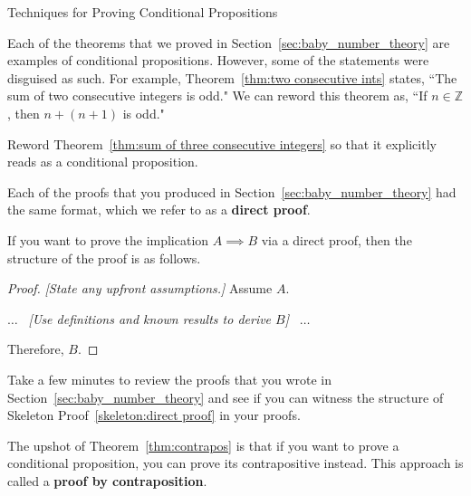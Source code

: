 \begin{section}{Techniques for Proving Conditional Propositions}\label{sec:Techniques_for_Proving_Conditional_Propositions}

Each of the theorems that we proved in Section~\ref{sec:baby_number_theory} are examples of conditional propositions. However, some of the statements were disguised as such. For example, Theorem~\ref{thm:two consecutive ints} states, ``The sum of two consecutive integers is odd." We can reword this theorem as, ``If $n\in\mathbb{Z}$, then $n+(n+1)$ is odd."

\begin{problem}\label{prob:reword as conditional}
Reword Theorem~\ref{thm:sum of three consecutive integers} so that it explicitly reads as a conditional proposition.
\end{problem}

Each of the proofs that you produced in Section~\ref{sec:baby_number_theory} had the same format, which we refer to as a \textbf{direct proof}. 

\begin{skeleton}\label{skeleton:direct proof}

If you want to prove the implication $A\implies B$ via a direct proof, then the structure of the proof is as follows.

\begin{mdframed}[style=skeleton]
\begin{proof}
\emph{[State any upfront assumptions.]} Assume $A$.
\begin{center}
$\ldots$ \ \emph{[Use definitions and known results to derive $B$]} \ $\ldots$\\
\end{center}
\noindent Therefore, $B$.
\end{proof}
\end{mdframed}
\end{skeleton}

Take a few minutes to review the proofs that you wrote in Section~\ref{sec:baby_number_theory} and see if you can witness the structure of Skeleton Proof~\ref{skeleton:direct proof} in your proofs. 

The upshot of Theorem~\ref{thm:contrapos} is that if you want to prove a conditional proposition, you can prove its contrapositive instead. This approach is called a \textbf{proof by contraposition}.


\end{section}
